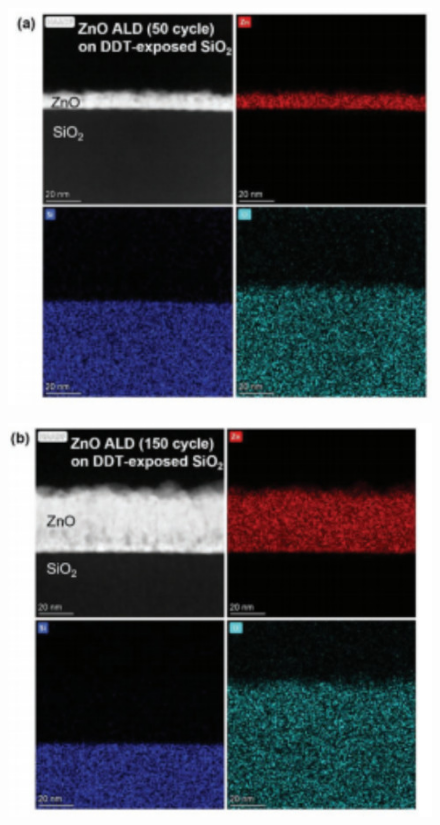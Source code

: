 \documentclass[UTF8,a4paper,12pt]{ctexart}%
\begin{document}
\begin{figure}[htb]
	\centering
	\begin{minipage}[t]{0.45\textwidth}
	\centering
	\includegraphics[width=1\textwidth]{15.jpg}
	\label{Fig:15}
	\end{minipage}
	\begin{minipage}[t]{0.45\textwidth}
	\centering
	\includegraphics[width=1\textwidth]{16.jpg}

\end{minipage}
\end{figure}
\end{document}
